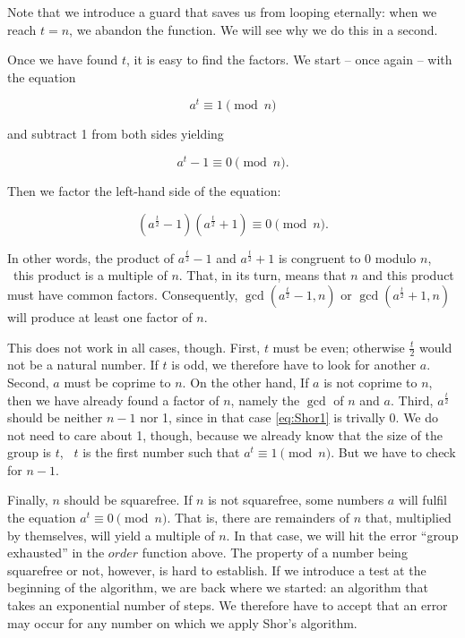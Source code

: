 \documentclass{scrreprt}
\newcommand{\Varid}[1]{\mathit{#1}}
\begin{document}
Note that we introduce a guard 
that saves us from looping eternally:
when we reach $t = n$, we abandon
the function.
We will see why we do this in a second.

Once we have found $t$,
it is easy to find the factors.
We start -- once again -- with the equation

\begin{equation}
a^t \equiv 1 \pmod{n}
\end{equation}

and subtract 1 from both sides yielding

\begin{equation}
a^t - 1 \equiv 0 \pmod{n}.
\end{equation}

Then we factor the left-hand side of the equation:

\begin{equation}\label{eq:Shor1}
(a^{\frac{t}{2}} - 1)(a^{\frac{t}{2}} + 1) \equiv 0 \pmod{n}.
\end{equation}

In other words,
the product of $a^{\frac{t}{2}} - 1$ and $a^{\frac{t}{2}} + 1$
is congruent to 0 modulo $n$, \ie\
this product is a multiple of $n$.
That, in its turn, means that $n$ and this product
must have common factors. Consequently,
$\gcd(a^{\frac{t}{2}} - 1, n)$ or 
$\gcd(a^{\frac{t}{2}} + 1, n)$
will produce at least one factor of $n$.

This does not work in all cases, though.
First, $t$ must be even;
otherwise $\frac{t}{2}$ would not be a natural number.
If $t$ is odd, we therefore have to look for another $a$.
Second, $a$ must be coprime to $n$.
On the other hand, If $a$ is not coprime to $n$,
then we have already found a factor of $n$,
namely the $\gcd$ of $n$ and $a$.
Third, $a^{\frac{t}{2}}$ should be neither
$n-1$ nor 1, since in that case \ref{eq:Shor1}
is trivally 0.
We do not need to care about 1, though, because
we already know
that the size of the group is $t$,
\ie\ $t$ is the first number such that
$a^t \equiv 1 \pmod{n}$.
But we have to check for $n-1$.

Finally, $n$ should be squarefree.
If $n$ is not squarefree,
some numbers $a$ will fulfil the equation
$a^t \equiv 0 \pmod{n}$.
That is, there are remainders of $n$
that, multiplied by themselves,
will yield a multiple of $n$.
In that case, we will hit the error
``group exhausted'' in the \ensuremath{\Varid{order}} function above.
The property of a number 
being squarefree or not, however,
is hard to establish.
If we introduce a test 
at the beginning of the algorithm,
we are back where we started:
an algorithm that takes 
an exponential number of steps.
We therefore have to accept
that an error may occur for any number
on which we apply Shor's algorithm.
\end{document}

